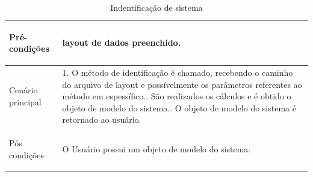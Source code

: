 \begin{table}[!htbp]
\begin{center}
\begin{tabularx}{\textwidth}{|>{\bfseries\raggedright\arraybackslash\center}m{5cm}|X|}
            Pré-condições                                   & layout de dados preenchido.                                                                                                                                                                                                                                                                          \\ \hline
            Cenário principal                               & 1. O método de identificação é chamado, recebendo o caminho do arquivo de layout e possívelmente os parâmetros referentes ao método em espessífico.\newline 2. São realizados os cálculos e é obtido o objeto de modelo do sistema.\newline 3. O objeto de modelo do sistema é retornado ao usuário. \\ \hline
            Pós condições                                   & O Usuário possui um objeto de modelo do sistema.                                                                                                                                                                                                                                                     \\ \hline
        \end{tabularx}
        \caption{Indentificação de sistema}
        \label{tab:uc2}
    \end{center}
\end{table}

